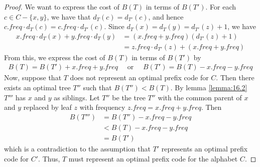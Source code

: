 \begin{proof}
	We want to express the cost of $B(T)$ in terms of $B(T')$. For each $c \in
	C - \{x, y\}$, we have that $d_T(c) = d_{T'}(c)$, and hence $c.freq \cdot
	d_T(c) = c.freq \cdot d_{T'}(c)$. Since $d_T(x) = d_T(y) = d_{T'}(z) + 1$,
	we have
	\begin{align}
		x.freq \cdot d_T(x) + y.freq \cdot d_T(y)
		&= (x.freq + y.freq)(d_{T'}(z) + 1) \\
		&= z.freq \cdot d_{T'}(z) + (x.freq + y.freq)
	\end{align}
	From this, we express the cost of $B(T)$ in terms of $B(T')$ by
	\begin{align}
		B(T) = B(T') + x.freq + y.freq
		\quad \text{ or } \quad
		B(T') = B(T) - x.freq - y.freq
	\end{align}
	Now, suppose that $T$ does not represent an optimal prefix code for $C$.
	Then there exists an optimal tree $T''$ such that $B(T'') < B(T)$. By
	lemma \ref{lemma:16.2} $T'''$ has $x$ and $y$ as siblings. Let $T''$ be
	the tree $T''$ with the common parent of $x$ and $y$ replaced by leaf $z$
	with frequency $z.freq = x.freq + y.freq$. Then
	\begin{align}
		B(T''') &= B(T'') - x.freq - y.freq \\
		&< B(T) - x.freq - y.freq \\
		&= B(T')
	\end{align}
	which is a contradiction to the assumption that $T'$ represents an optimal
	prefix code for $C'$. Thus, $T$ must represent an optimal prefix code for
	the alphabet $C$.
\end{proof}

